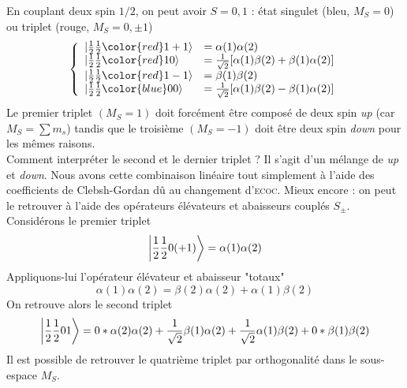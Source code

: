 En couplant deux spin $1/2$, on peut avoir $S=0,1$ : état singulet (bleu, $M_S=0$) ou triplet (rouge,
$M_S=0,\pm1$)
\begin{equation}
\left\{
\begin{array}{ll}
\vert \frac{1}{2}\frac{1}{2}   {\color{red} 1 }+1 \rangle  & = \alpha(1) \alpha(2) \\
\vert \frac{1}{2}\frac{1}{2}   {\color{red} 1 } 0 \rangle   & = \frac{1}{\sqrt{2}} [ \alpha(1) \beta(2) + \beta(1) \alpha(2) ] \\
\vert \frac{1}{2}\frac{1}{2}   {\color{red} 1 } -1 \rangle   & = \beta(1) \beta(2) \\
\vert \frac{1}{2}\frac{1}{2}   {\color{blue} 0 } 0 \rangle   & =\frac{1}{\sqrt{2}} [ \alpha(1) \beta(2) - \beta(1) \alpha(2) ] \\
\end{array} \right.
\end{equation}
Le premier triplet $(M_S=1)$ doit forcément être composé de deux spin \textit{up} (car $M_S=\sum
m_s$) tandis que le troisième $(M_S=-1)$ doit être deux spin \textit{down} pour les mêmes raisons.\\

Comment interpréter le second et le dernier triplet ? Il s'agit d'un mélange de \textit{up} et 
\textit{down}. Nous avons cette combinaison linéaire tout simplement à l'aide des coefficients
de Clebsh-Gordan dû au changement d'\textsc{ecoc}. Mieux encore : on peut le retrouver à l'aide
des opérateurs élévateurs et abaisseurs couplés $S_\pm$. Considérons le premier triplet
\begin{equation}
\ket{\frac{1}{2}\frac{1}{2}0(+1)} = \alpha(1)\alpha(2)
\end{equation}
Appliquons-lui l'opérateur élévateur et abaisseur "totaux"
\begin{equation}
[S_-(1)+S_-(2)]\alpha(1)\alpha(2) = \beta(2)\alpha(2)+\alpha(1)\beta(2)
\end{equation}
On retrouve alors le second triplet
\begin{equation}
\ket{\frac{1}{2}\frac{1}{2}01} = 0*\alpha(2)\alpha(2) + \frac{1}{\sqrt{2}}\beta(1)\alpha(2) + 
\frac{1}{\sqrt{2}}\alpha(1)\beta(2) + 0*\beta(1)\beta(2)
\end{equation}
Il est possible de retrouver le quatrième triplet par orthogonalité dans le sous-espace $M_S$.\\

